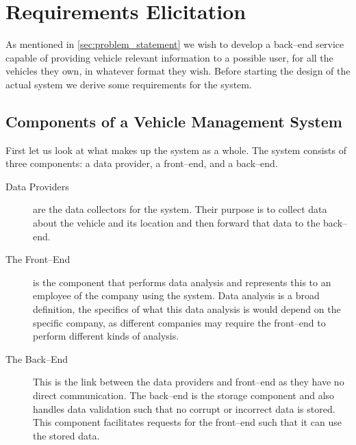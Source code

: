 \chapter{Requirements Elicitation}\label{cha:requirements_elicitation}
As mentioned in \cref{sec:problem_statement} we wish to develop a back--end service capable of providing vehicle relevant information to a possible user, for all the vehicles they own, in whatever format they wish.
Before starting the design of the actual system we derive some requirements for the system.

\section{Components of a Vehicle Management System}\label{sec:constituents_of_the_system}
First let us look at what makes up the system as a whole.
The system consists of three components: a data provider, a front--end, and a back--end.
\begin{description}
    \item [Data Providers] are the data collectors for the system. Their purpose is to collect data about the vehicle and its location and then forward that data to the back--end.
    \item [The Front--End] is the component that performs data analysis and represents this to an employee of the company using the system.
    Data analysis is a broad definition, the specifics of what this data analysis is would depend on the specific company, as different companies may require the front--end to perform different kinds of analysis.
    \item [The Back--End] This is the link between the data providers and front--end as they have no direct communication.
    The back--end is the storage component and also handles data validation such that no corrupt or incorrect data is stored.
    This component facilitates requests for the front--end such that it can use the stored data.
\end{description}

